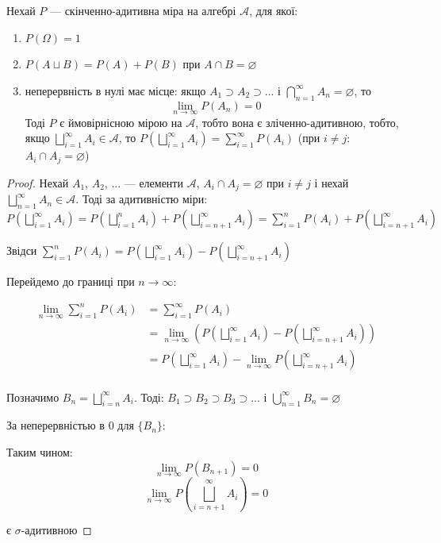 \begin{theorem}
    Нехай $P$ --- скінченно-адитивна міра на алгебрі $\mathcal{A}$, для якої:
    \begin{enumerate}
        \item $P(\Omega) = 1$
        \item $P(A \sqcup B) = P(A) + P(B)$ при $A \cap B = \varnothing$
        \item неперервність в нулі має місце:
        якщо $A_1 \supset A_2 \supset ...$ і $\bigcap\limits_{n=1}^{\infty} A_n = \varnothing$, то
        $$\lim_{n \rightarrow \infty} P(A_n) = 0$$
        Тоді $P$ є ймовірнісною мірою на $\mathcal{A}$, тобто вона є зліченно-адитивною,
        тобто, якщо $\bigsqcup\limits_{i=1}^{\infty} A_i \in \mathcal{A}$, то
        $P(\bigsqcup\limits_{i=1}^{\infty} A_i)
        = \sum\limits_{i=1}^{\infty} P(A_i)$ (при $i \neq j$: $A_i \cap A_j = \varnothing$)
    \end{enumerate}
\end{theorem}
\begin{proof}
    Нехай $A_1$, $A_2$, ... --- елементи $\mathcal{A}$, $A_i \cap A_j = \varnothing$
    при $i \neq j$ і нехай $\bigsqcup\limits_{n=1}^{\infty} A_n \in \mathcal{A}$. Тоді за 
    адитивністю міри: $P(\bigsqcup\limits_{i=1}^{\infty} A_i)
    = P(\bigsqcup\limits_{i=1}^{n} A_i) + P(\bigsqcup\limits_{i=n+1}^{\infty} A_i)
    = \sum\limits_{i=1}^{n} P(A_i) + P(\bigsqcup\limits_{i=n+1}^{\infty} A_i)$ 
    
    Звідси $\sum\limits_{i=1}^{n} P(A_i)
    = P(\bigsqcup\limits_{i=1}^{\infty} A_i) - P(\bigsqcup\limits_{i=n+1}^{\infty} A_i)$
    
    Перейдемо до границі при $n \rightarrow \infty$:
    
    $$\begin{array}{rl} 
        \lim_{n \rightarrow \infty} \sum\limits_{i=1}^{n} P(A_i)
         & = \sum\limits_{i=1}^{\infty} P(A_i) \\
        & = \lim_{n \rightarrow \infty} (P(\bigsqcup\limits_{i=1}^{\infty} A_i) - P(\bigsqcup\limits_{i=n+1}^{\infty} A_i)) \\
        & = P(\bigsqcup\limits_{i=1}^{\infty} A_i) - \lim_{n \rightarrow \infty} P(\bigsqcup\limits_{i=n+1}^{\infty} A_i) \\
    \end{array}$$
    
    Позначимо $B_n = \bigsqcup\limits_{i=n}^{\infty} A_i$. Тоді:
    $B_1 \supset B_2 \supset B_3 \supset ...$ і $\bigcup\limits_{n=1}^{\infty} B_n = \varnothing$
    
    За неперервністью в $0$ для $\{B_n\}$:
    
    Таким чином:
    $$\lim_{n \rightarrow \infty} P(B_{n+1}) = 0$$
    $$\lim_{n \rightarrow \infty} P(\bigsqcup\limits_{i=n+1}^{\infty} A_i) = 0$$
    
    є $\sigma$-адитивною
\end{proof}

